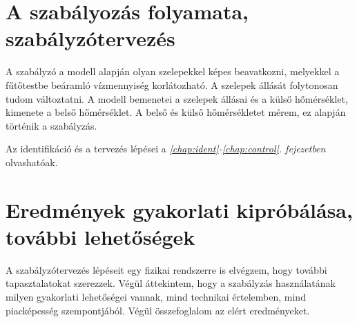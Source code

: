 \section*{A szabályozás folyamata, szabályzótervezés}

A szabályzó a  modell alapján olyan szelepekkel képes beavatkozni, melyekkel a fűtőtestbe beáramló vízmennyiség korlátozható. A szelepek állását folytonosan tudom változtatni. A modell bemenetei a szelepek állásai és a külső hőmérséklet, kimenete a belső hőmérséklet.  A belső és külső hőmérsékletet mérem, ez alapján történik a szabályzás. 

Az identifikáció és a tervezés lépései a \textit{\ref{chap:ident}-\ref{chap:control}. fejezetben} olvashatóak.


%


\section*{Eredmények gyakorlati kipróbálása, további lehetőségek}

A szabályzótervezés lépéseit egy fizikai rendszerre is elvégzem, hogy további tapasztalatokat szerezzek. Végül áttekintem, hogy a szabályzás használatának milyen gyakorlati lehetőségei vannak, mind technikai értelemben, mind piacképesség szempontjából. Végül összefoglalom az elért eredményeket.










